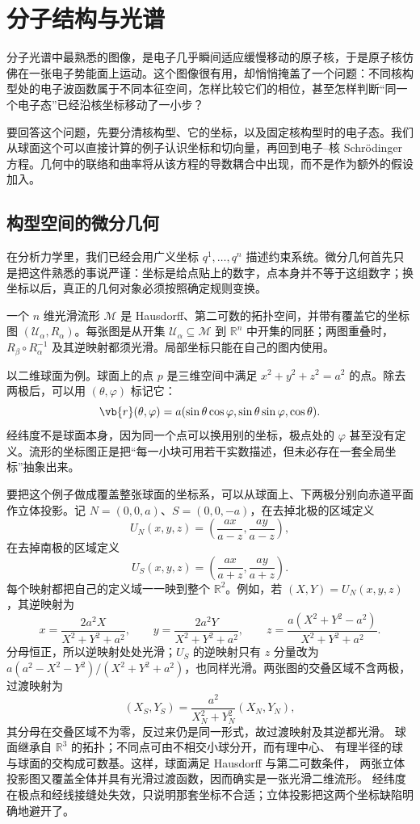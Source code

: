 \chapter{分子结构与光谱}
\label{ch:born-huang}


分子光谱中最熟悉的图像，是电子几乎瞬间适应缓慢移动的原子核，于是原子核仿佛在一张电子势能面上运动。这个图像很有用，却悄悄掩盖了一个问题：不同核构型处的电子波函数属于不同本征空间，怎样比较它们的相位，甚至怎样判断“同一个电子态”已经沿核坐标移动了一小步？

要回答这个问题，先要分清核构型、它的坐标，以及固定核构型时的电子态。我们从球面这个可以直接计算的例子认识坐标和切向量，再回到电子--核 Schr\"odinger 方程。几何中的联络和曲率将从该方程的导数耦合中出现，而不是作为额外的假设加入。

\section{构型空间的微分几何}

在分析力学里，我们已经会用广义坐标 \(q^1,\ldots,q^n\) 描述约束系统。微分几何首先只是把这件熟悉的事说严谨：坐标是给点贴上的数字，点本身并不等于这组数字；换坐标以后，真正的几何对象必须按照确定规则变换。

\begin{definition}[坐标图与光滑流形]
一个 \(n\) 维光滑流形 \(\mathcal M\) 是 Hausdorff、第二可数的拓扑空间，并带有覆盖它的坐标图 \((\mathcal U_\alpha,R_\alpha)\)。每张图是从开集 \(\mathcal U_\alpha\subseteq\mathcal M\) 到 \(\mathbb R^n\) 中开集的同胚；两图重叠时，\(R_\beta\circ R_\alpha^{-1}\) 及其逆映射都须光滑。局部坐标只能在自己的图内使用。
\end{definition}

以二维球面为例。球面上的点 \(p\) 是三维空间中满足
\(x^2+y^2+z^2=a^2\) 的点。除去两极后，可以用
\((\theta,\varphi)\) 标记它：
\[
\vb{r}(\theta,\varphi)
=a(\sin\theta\cos\varphi,
\sin\theta\sin\varphi,
\cos\theta).
\]
经纬度不是球面本身，因为同一个点可以换用别的坐标，极点处的
\(\varphi\) 甚至没有定义。流形的坐标图正是把“每一小块可用若干实数描述，但未必存在一套全局坐标”抽象出来。

要把这个例子做成覆盖整张球面的坐标系，可以从球面上、下两极分别向赤道平面作立体投影。记
$N=(0,0,a)$、$S=(0,0,-a)$，在去掉北极的区域定义
\[
U_N(x,y,z)=\left(\frac{ax}{a-z},\frac{ay}{a-z}\right),
\]
在去掉南极的区域定义
\[
U_S(x,y,z)=\left(\frac{ax}{a+z},\frac{ay}{a+z}\right).
\]
每个映射都把自己的定义域一一映到整个 $\mathbb R^2$。例如，若
$(X,Y)=U_N(x,y,z)$，其逆映射为
\[
x=\frac{2a^2X}{X^2+Y^2+a^2},\qquad
y=\frac{2a^2Y}{X^2+Y^2+a^2},\qquad
z=\frac{a(X^2+Y^2-a^2)}{X^2+Y^2+a^2}.
\]
分母恒正，所以逆映射处处光滑；$U_S$ 的逆映射只有 $z$ 分量改为
$a(a^2-X^2-Y^2)/(X^2+Y^2+a^2)$，也同样光滑。两张图的交叠区域不含两极，过渡映射为
\[
(X_S,Y_S)=\frac{a^2}{X_N^2+Y_N^2}(X_N,Y_N),
\]
其分母在交叠区域不为零，反过来仍是同一形式，故过渡映射及其逆都光滑。
球面继承自 $\mathbb R^3$ 的拓扑；不同点可由不相交小球分开，而有理中心、
有理半径的球与球面的交构成可数基。这样，球面满足 Hausdorff 与第二可数条件，
两张立体投影图又覆盖全体并具有光滑过渡函数，因而确实是一张光滑二维流形。
经纬度在极点和经线接缝处失效，只说明那套坐标不合适；立体投影把这两个坐标缺陷明确地避开了。


